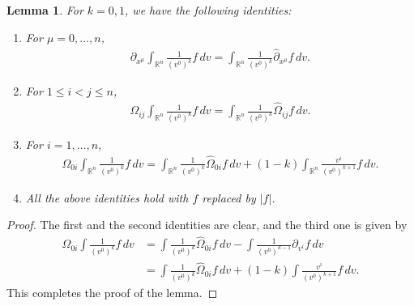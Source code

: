 \documentclass{article}
\newtheorem{lemma}{Lemma}[section]
\newcommand{\bbr}{{\mathbb R}}
\newcommand{\bbrn}{{\bbr^n}}
\begin{document}
%
\begin{lemma} \label{lem OmegaOmegahat}
For $ k = 0 , 1 $, we have the following identities:
\begin{enumerate}
\item For $ \mu = 0 , \dots , n $,
\begin{align*}
\partial_{ x^\mu } \int_\bbrn \frac{ 1 }{ ( v^0 )^k } f \, d v = \int_\bbrn \frac{ 1 }{ ( v^0 )^k } \hat{ \partial }_{ x^\mu } f \, d v .
\end{align*}
\item For $ 1 \leq i < j \leq n $,
\begin{align*}
\Omega_{ i j } \int_\bbrn \frac{ 1 }{ ( v^0 )^k } f \, d v = \int_\bbrn \frac{ 1 }{ ( v^0 )^k } \hat{ \Omega }_{ i j } f \, d v .
\end{align*}
\item For $ i = 1 , \dots , n $,
\begin{align*}
\Omega_{ 0 i } \int_\bbrn \frac{ 1 }{ ( v^0 )^k } f \, d v = \int_\bbrn \frac{ 1 }{ ( v^0 )^k } \hat{ \Omega }_{ 0 i } f \, d v + ( 1 - k ) \int_\bbrn \frac{ v^i }{ ( v^0 )^{ k + 1 } } f \, d v .
\end{align*}
\item All the above identities hold with $ f $ replaced by $ | f | $.
\end{enumerate}
\end{lemma}
\begin{proof}
The first and the second identities are clear, and the third one is given by
\begin{align*}
\Omega_{ 0 i } \int \frac{ 1 }{ ( v^0 )^k } f \, d v & = \int \frac{ 1 }{ ( v^0 )^k } \hat{ \Omega }_{ 0 i } f \, d v - \int \frac{ 1 }{ ( v^0 )^{ k - 1 } } \partial_{ v^i } f \, d v \\
& = \int \frac{ 1 }{ ( v^0 )^k } \hat{ \Omega }_{ 0 i } f \, d v + ( 1 - k ) \int \frac{ v^i }{ ( v^0 )^{ k + 1 } } f \, d v .
\end{align*}
This completes the proof of the lemma.
\end{proof}
\end{document}
